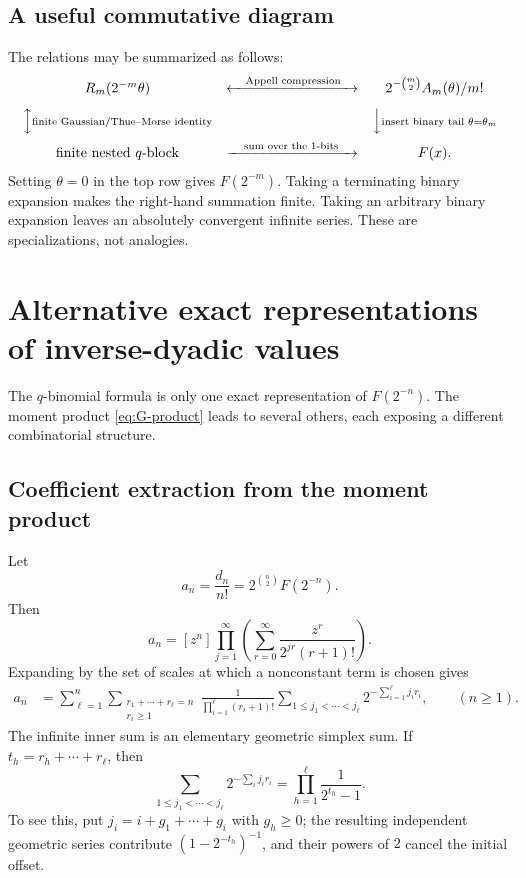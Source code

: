 \documentclass[11pt,oneside]{article}
\theoremstyle{definition}
\theoremstyle{remark}
\newcommand{\coeff}[2]{\left[#1^{#2}\right]}
\begin{document}
\subsection{A useful commutative diagram}

The relations may be summarized as follows:
\[
\begin{array}{ccc}
 R_m(2^{-m}\theta)
 &\xleftrightarrow{\quad\text{Appell compression}\quad}&
 2^{-\binom m2}A_m(\theta)/m!
 \\[0.8em]
 \Big\updownarrow\scriptstyle\text{finite Gaussian/Thue--Morse identity}
 &&
 \Big\downarrow\scriptstyle\text{insert binary tail }\theta=\theta_m
 \\[0.8em]
 \text{finite nested }q\text{-block}
 &\xrightarrow{\quad\text{sum over the 1-bits}\quad}&
 F(x).
\end{array}
\]
Setting $\theta=0$ in the top row gives $F(2^{-m})$.  Taking a terminating
binary expansion makes the right-hand summation finite.  Taking an arbitrary
binary expansion leaves an absolutely convergent infinite series.  These are
specializations, not analogies.

\section{Alternative exact representations of inverse-dyadic values}

The $q$-binomial formula is only one exact representation of
$F(2^{-n})$.  The moment product \eqref{eq:G-product} leads to several others,
each exposing a different combinatorial structure.

\subsection{Coefficient extraction from the moment product}

Let
\begin{equation}\label{eq:an-definition}
  a_n=\frac{d_n}{n!}=2^{\binom n2}F(2^{-n}).
\end{equation}
Then
\begin{equation}\label{eq:an-coeff}
  a_n=\coeff{z}{n}\prod_{j=1}^{\infty}
  \left(\sum_{r=0}^{\infty}
  \frac{z^r}{2^{jr}(r+1)!}\right).
\end{equation}
Expanding by the set of scales at which a nonconstant term is chosen gives
\begin{align}\label{eq:scale-selection}
 a_n
 &=\sum_{\ell=1}^{n}
   \sum_{\substack{r_1+\cdots+r_\ell=n\\r_i\ge1}}
   \frac1{\prod_{i=1}^{\ell}(r_i+1)!}
   \sum_{1\le j_1<\cdots<j_\ell}
   2^{-\sum_{i=1}^{\ell}j_ir_i},
 \qquad(n\ge1).
\end{align}
The infinite inner sum is an elementary geometric simplex sum.  If
$t_h=r_h+\cdots+r_\ell$, then
\begin{equation}\label{eq:geometric-simplex}
 \sum_{1\le j_1<\cdots<j_\ell}
 2^{-\sum_i j_ir_i}
 =\prod_{h=1}^{\ell}\frac1{2^{t_h}-1}.
\end{equation}
To see this, put
$j_i=i+g_1+\cdots+g_i$ with $g_h\ge0$; the resulting independent geometric
series contribute $(1-2^{-t_h})^{-1}$, and their powers of $2$ cancel the
initial offset.
\end{document}

